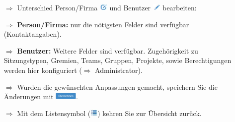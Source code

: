 \documentclass{article}
\begin{document}
\begin{multicols}{2}
\begin{tcolorbox}[colback=blue!5,colframe=blue!40!black,title={Personen/Firmen, sowie Benutzer bearbeiten}]
\begin{itemize}
  \item[$\Longrightarrow$] Unterschied Person/Firma \includegraphics[height=10pt]{Icons/bearbeiten.jpg} und Benutzer \includegraphics[height=10pt]{Icons/Stift.jpg} bearbeiten:
  \item[$\Longrightarrow$] \textbf{Person/Firma:} nur die nötigsten Felder sind verfügbar (Kontaktangaben).
  \item[$\Longrightarrow$] \textbf{Benutzer:} Weitere Felder sind verfügbar. Zugehörigkeit zu Sitzungstypen, Gremien, Teams, Gruppen, Projekte, sowie Berechtigungen werden hier konfiguriert ($\Longrightarrow$ Administrator).
  \item[$\Longrightarrow$] Wurden die gewünschten Anpassungen gemacht, speichern Sie die Änderungen mit \includegraphics[height=10pt]{Icons/B_Uebernehmen.jpg}.
	\item[$\Longrightarrow$] Mit dem Listensymbol (\includegraphics[height=10pt]{Icons/Listensymbol_zurueck.jpg}) kehren Sie zur Übersicht zurück.
\end{itemize}
\end{tcolorbox}


\end{multicols}


\vspace{\baselineskip}

\end{document}
